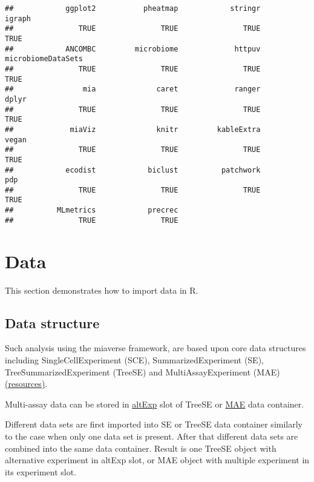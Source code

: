 \documentclass[
  oneside]{book}
\begin{document}
\begin{verbatim}
##            ggplot2           pheatmap            stringr             igraph 
##               TRUE               TRUE               TRUE               TRUE 
##            ANCOMBC         microbiome             httpuv microbiomeDataSets 
##               TRUE               TRUE               TRUE               TRUE 
##                mia              caret             ranger              dplyr 
##               TRUE               TRUE               TRUE               TRUE 
##             miaViz              knitr         kableExtra              vegan 
##               TRUE               TRUE               TRUE               TRUE 
##            ecodist            biclust          patchwork                pdp 
##               TRUE               TRUE               TRUE               TRUE 
##          MLmetrics            precrec 
##               TRUE               TRUE
\end{verbatim}

\hypertarget{data}{%
\chapter{Data}\label{data}}

This section demonstrates how to import data in R.

\hypertarget{data-structure}{%
\section{Data structure}\label{data-structure}}

Such analysis using the miaverse framework, are based upon core data structures
including SingleCellExperiment (SCE), SummarizedExperiment (SE), TreeSummarizedExperiment (TreeSE) and MultiAssayExperiment (MAE) \href{https://microbiome.github.io/course_2022_miaverse/study-material.html\#resources-for-treesummarizedexperiment}{(resources)}.

Multi-assay data can be stored in \href{https://microbiome.github.io/OMA/containers.html\#alternative-experiments}{altExp}
slot of TreeSE or \href{https://microbiome.github.io/OMA/containers.html\#multiassayexperiments}{MAE} data container.

Different data sets are first imported into SE or TreeSE data container similarly to the case when only one data set is present. After that different data sets are combined into the same data container. Result is one TreeSE object with alternative experiment in altExp slot, or MAE object with multiple experiment in its experiment slot.
\end{document}
